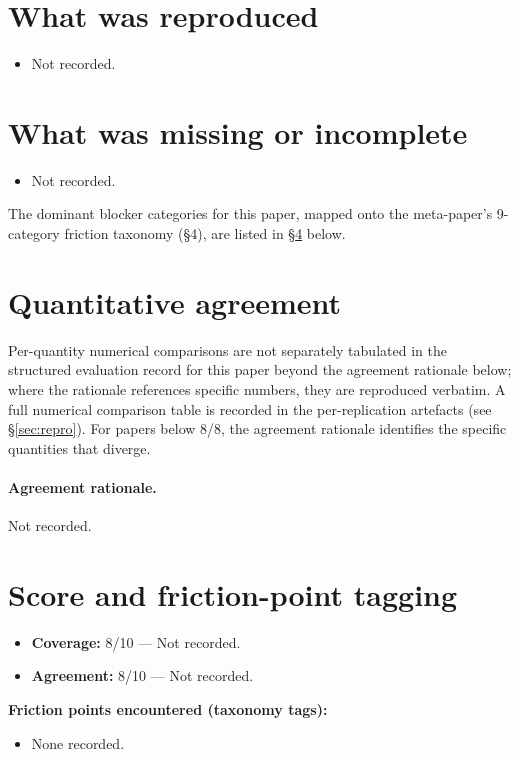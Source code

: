 \documentclass[11pt]{article}
\begin{document}
\section{What was reproduced}
\begin{itemize}
\item Not recorded.
\end{itemize}

\section{What was missing or incomplete}
\begin{itemize}
\item Not recorded.
\end{itemize}
The dominant blocker categories for this paper, mapped onto the meta-paper's 9-category friction taxonomy (\S4), are listed in \S\ref{sec:friction} below.

\section{Quantitative agreement}
Per-quantity numerical comparisons are not separately tabulated in the structured evaluation record for this paper beyond the agreement rationale below; where the rationale references specific numbers, they are reproduced verbatim. A full numerical comparison table is recorded in the per-replication artefacts (see \S\ref{sec:repro}). For papers below 8/8, the agreement rationale identifies the specific quantities that diverge.

\paragraph{Agreement rationale.} Not recorded.

\section{Score and friction-point tagging}\label{sec:friction}
\begin{itemize}
\item \textbf{Coverage:} 8/10 --- Not recorded.
\item \textbf{Agreement:} 8/10 --- Not recorded.
\end{itemize}

\noindent\textbf{Friction points encountered (taxonomy tags):}
\begin{itemize}
\item None recorded.
\end{itemize}
\end{document}

